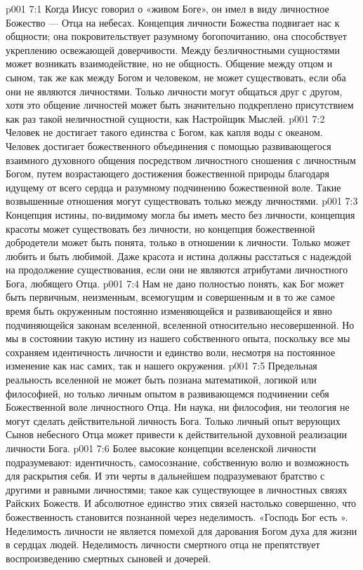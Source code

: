\vs p001 7:1 Когда Иисус говорил о «живом Боге», он имел в виду личностное Божество --- Отца на небесах. Концепция личности Божества подвигает нас к общности; она покровительствует разумному богопочитанию, она способствует укреплению освежающей доверчивости. Между безличностными сущностями может возникать взаимодействие, но не общность. Общение между отцом и сыном, так же как между Богом и человеком, не может существовать, если оба они не являются личностями. Только личности могут общаться друг с другом, хотя это общение личностей может быть значительно подкреплено присутствием как раз такой неличностной сущности, как Настройщик Мыслей.
\vs p001 7:2 Человек не достигает такого единства с Богом, как капля воды с океаном. Человек достигает божественного объединения с помощью развивающегося взаимного духовного общения посредством личностного сношения с личностным Богом, путем возрастающего достижения божественной природы благодаря идущему от всего сердца и разумному подчинению божественной воле. Такие возвышенные отношения могут существовать только между личностями.
\vs p001 7:3 \pc Концепция истины, по\hyp{}видимому могла бы иметь место без личности, концепция красоты может существовать без личности, но концепция божественной добродетели может быть понята, только в отношении к личности. Только  может любить и быть любимой. Даже красота и истина должны расстаться с надеждой на продолжение существования, если они не являются атрибутами личностного Бога, любящего Отца.
\vs p001 7:4 \pc Нам не дано полностью понять, как Бог может быть первичным, неизменным, всемогущим и совершенным и в то же самое время быть окруженным постоянно изменяющейся и развивающейся и явно подчиняющейся законам вселенной, вселенной относительно несовершенной. Но мы в состоянии  такую истину из нашего собственного опыта, поскольку все мы сохраняем идентичность личности и единство воли, несмотря на постоянное изменение как нас самих, так и нашего окружения.
\vs p001 7:5 Предельная реальность вселенной не может быть познана математикой, логикой или философией, но только личным опытом в развивающемся подчинении себя Божественной воле личностного Отца. Ни наука, ни философия, ни теология не могут сделать действительной личность Бога. Только личный опыт верующих Сынов небесного Отца может привести к действительной духовной реализации личности Бога.
\vs p001 7:6 \pc Более высокие концепции вселенской личности подразумевают: идентичность, самосознание, собственную волю и возможность для раскрытия себя. И эти черты в дальнейшем подразумевают братство с другими и равными личностями; такое как существующее в личностных связях Райских Божеств. И абсолютное единство этих связей настолько совершенно, что божественность становится познанной через неделимость. «Господь Бог есть ». Неделимость личности не является помехой для дарования Богом духа для жизни в сердцах людей. Неделимость личности смертного отца не препятствует воспроизведению смертных сыновей и дочерей.

